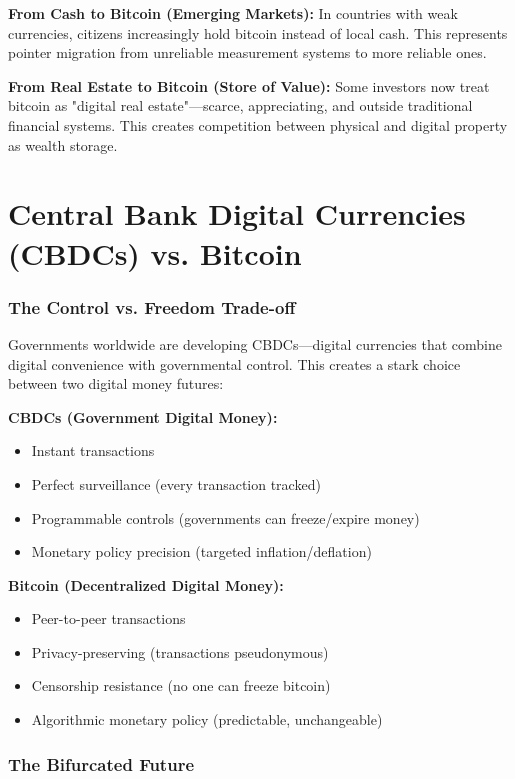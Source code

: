 \documentclass[11pt,oneside]{book}
\begin{document}
\textbf{From Cash to Bitcoin (Emerging Markets):}
In countries with weak currencies, citizens increasingly hold bitcoin instead of local cash. This represents pointer migration from unreliable measurement systems to more reliable ones.

\textbf{From Real Estate to Bitcoin (Store of Value):}
Some investors now treat bitcoin as "digital real estate"—scarce, appreciating, and outside traditional financial systems. This creates competition between physical and digital property as wealth storage.

\section{Central Bank Digital Currencies (CBDCs) vs. Bitcoin}

\subsubsection{The Control vs. Freedom Trade-off}

Governments worldwide are developing CBDCs—digital currencies that combine digital convenience with governmental control. This creates a stark choice between two digital money futures:

\textbf{CBDCs (Government Digital Money):}
\begin{itemize}
\item Instant transactions
\item Perfect surveillance (every transaction tracked)
\item Programmable controls (governments can freeze/expire money)
\item Monetary policy precision (targeted inflation/deflation)
\end{itemize}

\textbf{Bitcoin (Decentralized Digital Money):}
\begin{itemize}
\item Peer-to-peer transactions
\item Privacy-preserving (transactions pseudonymous)
\item Censorship resistance (no one can freeze bitcoin)
\item Algorithmic monetary policy (predictable, unchangeable)
\end{itemize}

\subsubsection{The Bifurcated Future}
\end{document}
